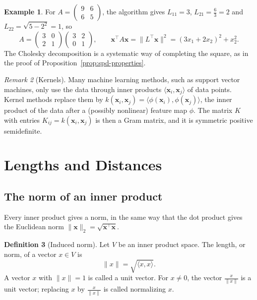 \documentclass[11pt]{article}
\newcommand{\norm}[1]{\lVert #1 \rVert}
\newcommand{\ip}[2]{\langle #1, #2 \rangle}
\theoremstyle{definition}
\newtheorem{definition}{Definition}[section]
\newtheorem{example}[definition]{Example}
\theoremstyle{plain}
\theoremstyle{remark}
\newtheorem{remark}[definition]{Remark}
\begin{document}
\begin{example}\label{ex:cholesky}
    For $A = \begin{pmatrix} 9 & 6 \\ 6 & 5 \end{pmatrix}$, the algorithm gives $L_{11} = 3$, $L_{21} = \frac{6}{3} = 2$ and $L_{22} = \sqrt{5 - 2^2} = 1$, so
    \[A = \begin{pmatrix} 3 & 0 \\ 2 & 1 \end{pmatrix}\begin{pmatrix} 3 & 2 \\ 0 & 1 \end{pmatrix}, \qquad \mathbf{x}^\top A\mathbf{x} = \norm{L^\top\mathbf{x}}^2 = (3x_1 + 2x_2)^2 + x_2^2.\]
    The Cholesky decomposition is a systematic way of completing the square, as in the proof of Proposition~\ref{prop:spd-properties}.
\end{example}

\begin{remark}[Kernels]
    Many machine learning methods, such as support vector machines, only use the data through inner products $\ip{\mathbf{x}_i}{\mathbf{x}_j}$ of data points. Kernel methods replace them by $k(\mathbf{x}_i, \mathbf{x}_j) = \ip{\phi(\mathbf{x}_i)}{\phi(\mathbf{x}_j)}$, the inner product of the data after a (possibly nonlinear) feature map $\phi$. The matrix $K$ with entries $K_{ij} = k(\mathbf{x}_i, \mathbf{x}_j)$ is then a Gram matrix, and it is symmetric positive semidefinite.
\end{remark}

\section{Lengths and Distances}\label{sec:lengths}

\subsection{The norm of an inner product}

Every inner product gives a norm, in the same way that the dot product gives the Euclidean norm $\norm{\mathbf{x}}_2 = \sqrt{\mathbf{x}^\top \mathbf{x}}$.

\begin{definition}[Induced norm]
    Let $V$ be an inner product space. The length, or norm, of a vector $x \in V$ is
    \[\norm{x} = \sqrt{\ip{x}{x}}.\]
    A vector $x$ with $\norm{x} = 1$ is called a unit vector. For $x \neq 0$, the vector $\frac{x}{\norm{x}}$ is a unit vector; replacing $x$ by $\frac{x}{\norm{x}}$ is called normalizing $x$.
\end{definition}
\end{document}
